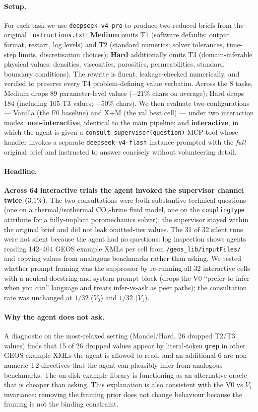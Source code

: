 \documentclass{article}
\begin{document}
\paragraph{Setup.} For each task we use \texttt{deepseek-v4-pro} to produce two reduced briefs from the original \texttt{instructions.txt}: \textbf{Medium} omits T1 (software defaults: output format, restart, log levels) and T2 (standard numerics: solver tolerances, time-step limits, discretisation choices); \textbf{Hard} additionally omits T3 (domain-inferable physical values: densities, viscosities, porosities, permeabilities, standard boundary conditions). The rewrite is fluent, leakage-checked numerically, and verified to preserve every T4 problem-defining value verbatim. Across the 8 tasks, Medium drops 89 parameter-level values ($-21\%$ chars on average); Hard drops 184 (including 105 T3 values; $-50\%$ chars). We then evaluate two configurations --- Vanilla (the F0 baseline) and X+M (the val best cell) --- under two interaction modes: \textbf{non-interactive}, identical to the main pipeline; and \textbf{interactive}, in which the agent is given a \texttt{consult\_supervisor(question)} MCP tool whose handler invokes a separate \texttt{deepseek-v4-flash} instance prompted with the \emph{full} original brief and instructed to answer concisely without volunteering detail.

\paragraph{Headline.} \textbf{Across 64 interactive trials the agent invoked the supervisor channel twice ($3.1\%$).} The two consultations were both substantive technical questions (one on a thermal/isothermal CO$_2$-brine fluid model, one on the \texttt{couplingType} attribute for a fully-implicit poromechanics solver); the supervisor stayed within the original brief and did not leak omitted-tier values. The 31 of 32 silent runs were not silent because the agent had no questions: log inspection shows agents reading 142--404 GEOS example XMLs per cell from \texttt{/geos\_lib/inputFiles/} and copying values from analogous benchmarks rather than asking. We tested whether prompt framing was the suppressor by re-running all 32 interactive cells with a neutral docstring and system-prompt block (drops the V0 ``prefer to infer when you can'' language and treats infer-vs-ask as peer paths); the consultation rate was unchanged at $1/32$ ($V_0$) and $1/32$ ($V_1$).

\paragraph{Why the agent does not ask.} A diagnostic on the most-relaxed setting (Mandel/Hard, 26 dropped T2/T3 values) finds that 15 of 26 dropped values appear by literal-token \texttt{grep} in other GEOS example XMLs the agent is allowed to read, and an additional 6 are non-numeric T2 directives that the agent can plausibly infer from analogous benchmarks. The on-disk example library is functioning as an alternative oracle that is cheaper than asking. This explanation is also consistent with the V0 vs $V_1$ invariance: removing the framing prior does not change behaviour because the framing is not the binding constraint.
\end{document}
